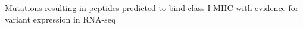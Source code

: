 \label{fig:expressed_mhc_binding_mutations} Mutations resulting in peptides predicted to bind class I MHC with evidence for variant expression in RNA-seq